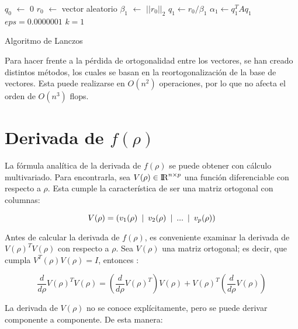 \begin{algorithm}[H] 
 $q_0$ $\leftarrow$ $0$\;
 $r_0$ $\leftarrow$ vector aleatorio\;
 $\beta_1$ $\leftarrow$ $||r_0||_2$\;
 $q_1 \leftarrow r_0 / \beta_1$\;
 $\alpha_1 \leftarrow q_1^T A q_1$\;
 $eps = 0.0000001$\;
 $k = 1$ \;
 \caption{Algoritmo de Lanczos}
\end{algorithm}

Para hacer frente a la pérdida de ortogonalidad entre los vectores, se han creado distintos métodos, los cuales se basan en la reortogonalización de la base de vectores. \cite{demmel1997applied} Esta puede realizarse en $O(n^2)$ operaciones, por lo que no afecta el orden de $O(n^3)$ flops.

\section{Derivada de $f(\rho)$}

La fórmula analítica de la derivada de $f(\rho)$ se puede obtener con cálculo multivariado. Para encontrarla, sea $V(\rho) \in {\rm I\!R}^{n \times p}$ una función diferenciable con respecto a $\rho$. Esta cumple la característica de ser una matriz ortogonal con columnas:

\begin{equation*}
	V(\rho) = (v_1(\rho) \enskip|\enskip v_2(\rho) \enskip|\enskip ... \enskip|\enskip v_p(\rho))
\end{equation*}

Antes de calcular la derivada de $f(\rho)$, es conveniente examinar la derivada de $V(\rho)^T V(\rho)$ con respecto a $\rho$. Sea $V(\rho)$ una matriz ortogonal; es decir, que cumpla $V^T(\rho) V(\rho) = I$, entonces \cite{ngo2012trace}:

\begin{equation*}
\frac{d}{d\rho} V(\rho)^T V(\rho) = \left(\frac{d}{d\rho}V(\rho)^T\right) V(\rho)  + V(\rho)^T 	\left( \frac{d}{d\rho} V(\rho) \right)
\end{equation*}

\vspace{5mm}

La derivada de $V(\rho)$ no se conoce explícitamente, pero se puede derivar componente a componente. De esta manera:


